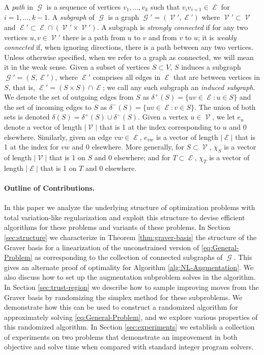 \documentclass[pdflatex,sn-mathphys-num]{sn-jnl}%
\DeclareMathOperator{\Gcal}{\mathcal{G}}
\DeclareMathOperator{\Ecal}{\mathcal{E}}
\DeclareMathOperator{\Vcal}{\mathcal{V}}
\begin{document}
A \textit{path} in $\Gcal$ is a sequence of vertices $v_1, \ldots, v_k$ such that $v_iv_{i+1} \in \Ecal$ for $i=1,\ldots,k-1$. A \textit{subgraph} of $\Gcal$ is a graph $\Gcal' = (\Vcal', \Ecal')$ where $\Vcal' \subset \Vcal$ and $\Ecal' \subset \Ecal \cap (\Vcal' \times \Vcal')$. A subgraph is \textit{strongly connected} if for any two vertices $u, v\in \Vcal'$ there is a path from $u$ to $v$ and from $v$ to $u$;  it is \textit{weakly connected} if, when ignoring directions, there is a path between any two vertices. Unless otherwise specified, when we refer to a graph as connected, we will mean it in the weak sense. Given a subset of vertices $S \subset V$, $S$ induces a subgraph $\Gcal' = (S, \Ecal')$, where $\Ecal'$ comprises all edges in $\Ecal$ that are between vertices in $S$, that is, $\Ecal' = (S \times S) \cap \Ecal$;  we call any such subgraph an \textit{induced subgraph}. We denote the set of outgoing edges from $S$ as $\delta^+(S) = \{uv \in \Ecal: u \in S\}$ and the set of incoming edges to $S$ as $\delta^-(S) = \{uv \in \Ecal: v \in S\}$. The union of both sets is denoted $\delta(S) = \delta^+(S) \cup \delta^-(S)$.
Given a vertex $u\in \Vcal$, we let $e_u$ denote a vector of length $|\Vcal|$ that is 1 at the index corresponding to $u$ and 0 elsewhere. Similarly, given an edge $vw \in \Ecal$, $e_{vw}$ is a vector of length $|\Ecal|$ that is 1 at the index for $vw$ and 0 elsewhere. More generally, for $S \subset \Vcal$, $\chi_S$ is a vector of length $|\Vcal|$ that is 1 on $S$ and 0 elsewhere; and for $T \subset \Ecal$, $\chi_T$ is a vector of length $|\Ecal|$ that is 1 on $T$ and 0 elsewhere.

\paragraph{Outline of Contributions.}
In this paper we analyze the underlying structure of optimization problems with total variation-like regularization and exploit this structure to devise efficient algorithms for these problems and variants of these problems. 
In Section \ref{sec:structure} we characterize in Theorem \ref{thm:graver-basis} the structure of the Graver basis for a linearization of the unconstrained version of \eqref{eq:General-Problem} as corresponding to the collection of connected subgraphs of $\Gcal$. This gives an alternate proof of optimality for Algorithm \ref{alg:NL-Augmentation}. We also discuss how to set up the augmentation subproblem solves in the algorithm.
In Section \ref{sec:trust-region} we describe how to sample improving moves from the Graver basis by randomizing the simplex method  for these subproblems. We demonstrate how this can be used to construct a randomized algorithm for approximately solving \eqref{eq:General-Problem}, and we explore various properties of this randomized algorithm.
In Section \ref{sec:experiments} we establish a collection of experiments on two problems that demonstrate an improvement in both objective and solve time when compared with standard integer program solvers.
\end{document}
